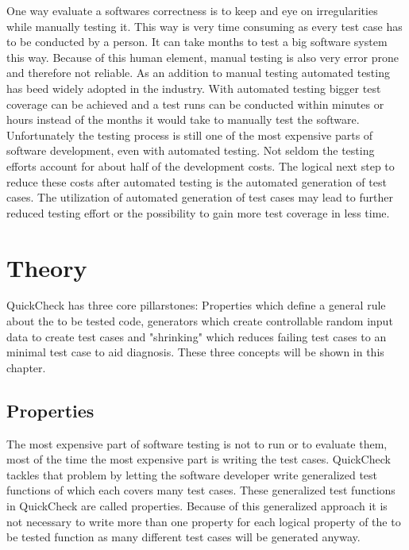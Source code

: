 \documentclass[a4paper, 12pt]{article} %
\begin{document}
One way evaluate a softwares correctness is to keep and eye on irregularities while manually testing it. This way is very time consuming as every test case has to be conducted by a person. It can take months to test a big software system this way. \cite{Arts06} Because of this human element, manual testing is also very error prone and therefore not reliable. As an addition to manual testing automated testing has beed widely adopted in the industry. With automated testing bigger test coverage can be achieved and a test runs can be conducted within minutes or hours instead of the months it would take to manually test the software. Unfortunately the testing process is still one of the most expensive parts of software development, even with automated testing. Not seldom the testing efforts account for about half of the development costs. \cite{Claessen2000} The logical next step to reduce these costs after automated testing is the automated generation of test cases. The utilization of automated generation of test cases may lead to further reduced testing effort or the possibility to gain more test coverage in less time.

\section{Theory}

QuickCheck has three core pillarstones: Properties which define a general rule about the to be tested code, generators which create controllable random input data to create test cases and "shrinking" which reduces failing test cases to an minimal test case to aid diagnosis. These three concepts will be shown in this chapter.

\subsection{Properties}

The most expensive part of software testing is not to run or to evaluate them, most of the time the most expensive part is writing the test cases. QuickCheck tackles that problem by letting the software developer write generalized test functions of which each covers many test cases. These generalized test functions in QuickCheck are called properties. \cite{Hughes2010} Because of this generalized approach it is not necessary to write more than one property for each logical property of the to be tested function as many different test cases will be generated anyway. \cite{Hughes2006}
\end{document}
